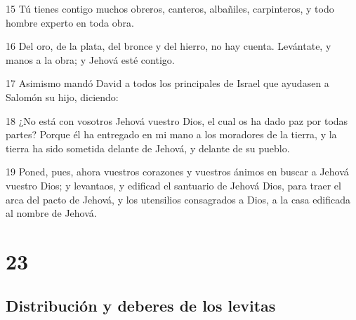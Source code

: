 \par 15 Tú tienes contigo muchos obreros, canteros, albañiles, carpinteros, y todo hombre experto en toda obra.
\par 16 Del oro, de la plata, del bronce y del hierro, no hay cuenta. Levántate, y manos a la obra; y Jehová esté contigo.
\par 17 Asimismo mandó David a todos los principales de Israel que ayudasen a Salomón su hijo, diciendo:
\par 18 ¿No está con vosotros Jehová vuestro Dios, el cual os ha dado paz por todas partes? Porque él ha entregado en mi mano a los moradores de la tierra, y la tierra ha sido sometida delante de Jehová, y delante de su pueblo.
\par 19 Poned, pues, ahora vuestros corazones y vuestros ánimos en buscar a Jehová vuestro Dios; y levantaos, y edificad el santuario de Jehová Dios, para traer el arca del pacto de Jehová, y los utensilios consagrados a Dios, a la casa edificada al nombre de Jehová.

\chapter{23}

\section*{Distribución y deberes de los levitas}

